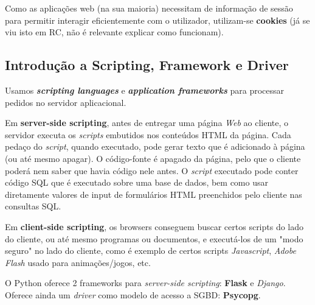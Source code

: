 \documentclass[oneside]{book}
\theoremstyle{definition}
\begin{document}
Como as aplicações web (na sua maioria) necessitam de informação de sessão para permitir interagir eficientemente com o utilizador, utilizam-se \textbf{cookies} (já se viu isto em RC, não é relevante explicar como funcionam).

\subsection{Introdução a Scripting, Framework e Driver}
Usamos \textbf{\textit{scripting languages}} e \textbf{\textit{application frameworks}} para processar pedidos no servidor aplicacional.

Em \textbf{server-side scripting}, antes de entregar uma página \textit{Web} ao cliente, o servidor executa os \textit{scripts} embutidos nos conteúdos HTML da página. Cada pedaço do \textit{script}, quando executado, pode gerar texto que é adicionado à página (ou até mesmo apagar). O código-fonte é apagado da página, pelo que o cliente poderá nem saber que havia código nele antes. O \textit{script} executado pode conter código SQL que é executado sobre uma base de dados, bem como usar diretamente valores de input de formulários HTML preenchidos pelo cliente nas consultas SQL.

Em \textbf{client-side scripting}, os browsers conseguem buscar certos scripts do lado do cliente, ou até mesmo programas ou documentos, e executá-los de um "modo seguro" no lado do cliente, como é exemplo de certos scripts \textit{Javascript}, \textit{Adobe Flash} usado para animações/jogos, etc.

O Python oferece 2 frameworks para \textit{server-side scripting}: \textbf{Flask} e \textit{Django}. Oferece ainda um \textit{driver} como modelo de acesso a SGBD: \textbf{Psycopg}.
\end{document}
